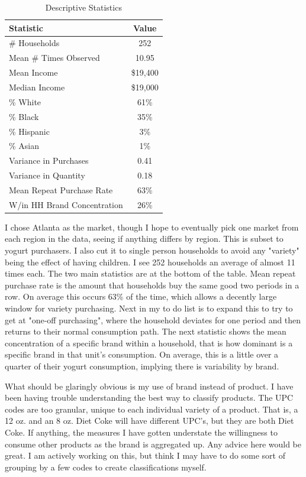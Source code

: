 \documentclass[11pt]{article}
\theoremstyle{definition}
\theoremstyle{remark}
\begin{document}
\begin{table}[htbp]
    \centering
    \caption{Descriptive Statistics}
    \label{tab:desc_stats}
    \begin{tabular}{lc}
        \toprule
        Statistic & Value \\
        \midrule
        \# Households               & 252 \\
        Mean \# Times Observed      & 10.95 \\
        Mean Income                 & \$19,400 \\
        Median Income               & \$19,000 \\
        \% White                    & 61\% \\
        \% Black                    & 35\% \\
        \% Hispanic                 & 3\% \\
        \% Asian                    & 1\% \\
        Variance in Purchases       & 0.41 \\
        Variance in Quantity        & 0.18 \\
        Mean Repeat Purchase Rate   & 63\% \\
        W/in HH Brand Concentration & 26\%
        \bottomrule
    \end{tabular}
\end{table}

I chose Atlanta as the market, though I hope to eventually pick one market from each region in the data, seeing if anything differs by region. This is subset to yogurt purchasers. I also cut it to single person households to avoid any "variety" being the effect of having children. I see 252 households an average of almost 11 times each. The two main statistics are at the bottom of the table. Mean repeat purchase rate is the amount that households buy the same good two periods in a row. On average this occurs 63\% of the time,  which allows a decently large window for variety purchasing. Next in my to do list is to expand this to try to get at "one-off purchasing", where the household deviates for one period and then returns to their normal consumption path. The next statistic shows the mean concentration of a specific brand within a household, that is how dominant is a specific brand in that unit's consumption. On average, this is a little over a quarter of their yogurt consumption, implying there is variability by brand.

What should be glaringly obvious is my use of brand instead of product. I have been having trouble understanding the best way to classify products. The UPC codes are too granular, unique to each individual variety of a product. That is, a 12 oz. and an 8 oz. Diet Coke will have different UPC's, but they are both Diet Coke. If anything, the measures I have gotten understate the willingness to consume other products as the brand is aggregated up. Any advice here would be great. I am actively working on this, but think I may have to do some sort of grouping by a few codes to create classifications myself.
\end{document}

